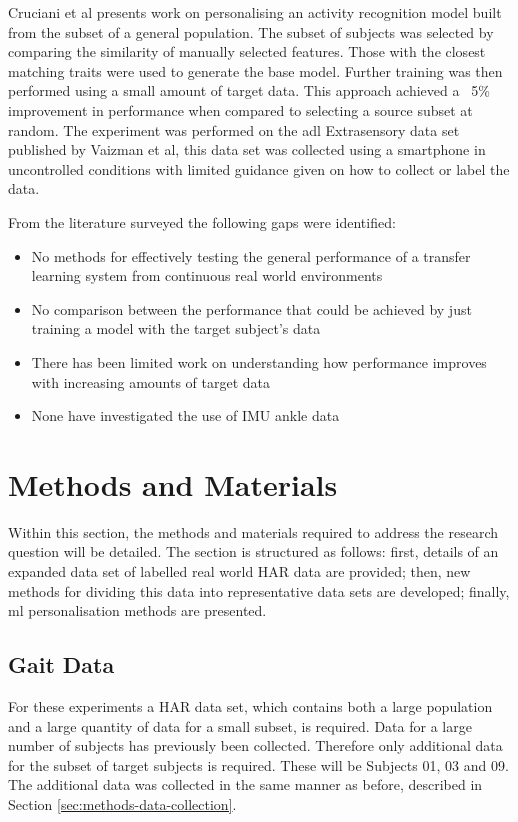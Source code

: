 Cruciani et al presents work on personalising an activity recognition model built from the subset of a general population. The subset of subjects was selected by comparing the similarity of manually selected features. Those with the closest matching traits were used to generate the base model. Further training was then performed using a small amount of target  data. This approach achieved a ~5\% improvement in performance when compared to selecting a source subset at random\cite{Cruciani2020}. The experiment was performed on the \acrshort{adl} Extrasensory data set published by Vaizman et al\cite{Vaizman2017}, this data set was collected using a smartphone in uncontrolled conditions with limited guidance given on how to collect or label the data.

From the literature surveyed the following gaps were identified:
\begin{itemize}
\item No methods for effectively testing the general performance of a transfer learning system from continuous real world environments
\item No comparison between the performance that could be achieved by just training a model with the target subject's data
\item There has been limited work on understanding how performance improves with increasing amounts of target data
\item None have investigated the use of IMU ankle data
\end{itemize}


\section{Methods and Materials}
\label{sec:personalistaion-methods}
Within this section, the methods and materials required to address the research question will be detailed. The section is structured as follows: first, details of an expanded data set of labelled real world HAR data are provided; then, new methods for dividing this data into representative data sets are developed; finally, \acrshort{ml} personalisation methods are presented.

\subsection{Gait Data}
For these experiments a HAR data set, which contains both a large population and a large quantity of data for a small subset, is required. Data for a large number of subjects has previously been collected. Therefore only additional data for the subset of target subjects is required. These will be Subjects 01, 03 and 09. The additional data was collected in the same manner as before, described in Section \ref{sec:methods-data-collection}.

